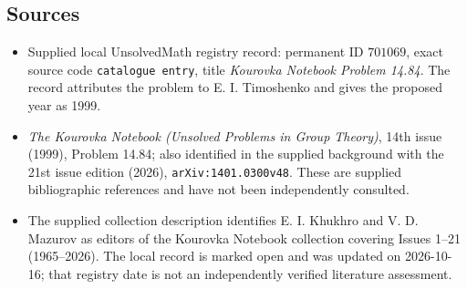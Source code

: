 \documentclass[11pt]{article}
\begin{document}
\subsection{Sources}
\begin{itemize}
\item Supplied local UnsolvedMath registry record: permanent ID \(701069\), exact source code \texttt{catalogue entry}, title \emph{Kourovka Notebook Problem 14.84}. The record attributes the problem to E. I. Timoshenko and gives the proposed year as 1999.
\item \emph{The Kourovka Notebook (Unsolved Problems in Group Theory)}, 14th issue (1999), Problem 14.84; also identified in the supplied background with the 21st issue edition (2026), \texttt{arXiv:1401.0300v48}. These are supplied bibliographic references and have not been independently consulted.
\item The supplied collection description identifies E. I. Khukhro and V. D. Mazurov as editors of the Kourovka Notebook collection covering Issues 1--21 (1965--2026). The local record is marked open and was updated on 2026-10-16; that registry date is not an independently verified literature assessment.
\end{itemize}
\end{document}
